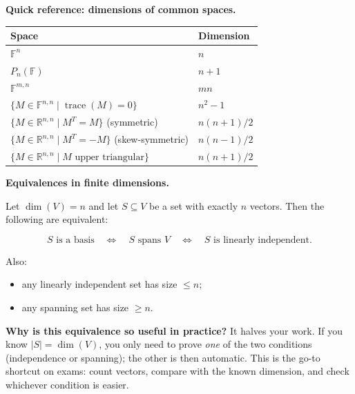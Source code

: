 \begin{keyformula}
\textbf{Quick reference: dimensions of common spaces.}

\medskip

\begin{tabular}{ll}
Space & Dimension \\
\hline
$\mathbb{F}^n$ & $n$ \\
$P_n(\mathbb{F})$ & $n+1$ \\
$\mathbb{F}^{m,n}$ & $mn$ \\
$\{M\in\mathbb{F}^{n,n}\mid \operatorname{trace}(M)=0\}$ & $n^2-1$ \\
$\{M\in\mathbb{R}^{n,n}\mid M^T=M\}$ (symmetric) & $n(n+1)/2$ \\
$\{M\in\mathbb{R}^{n,n}\mid M^T=-M\}$ (skew-symmetric) & $n(n-1)/2$ \\
$\{M\in\mathbb{R}^{n,n}\mid M\text{ upper triangular}\}$ & $n(n+1)/2$ \\
\end{tabular}
\end{keyformula}

\begin{keyformula}

\textbf{Equivalences in finite dimensions.}

Let $\dim(V)=n$ and let $S\subseteq V$ be a set with exactly $n$ vectors. Then the following are equivalent:

\[
S\text{ is a basis}\quad\Longleftrightarrow\quad S\text{ spans }V \quad\Longleftrightarrow\quad S\text{ is linearly independent}.
\]

Also:

\begin{itemize}

\item any linearly independent set has size $\le n$;

\item any spanning set has size $\ge n$.

\end{itemize}

\end{keyformula}

\begin{policynote}
\textbf{Why is this equivalence so useful in practice?}
It halves your work.  If you know $|S|=\dim(V)$, you only need to prove \emph{one} of the two conditions (independence or spanning); the other is then automatic.
This is the go-to shortcut on exams: count vectors, compare with the known dimension, and check whichever condition is easier.
\end{policynote}

